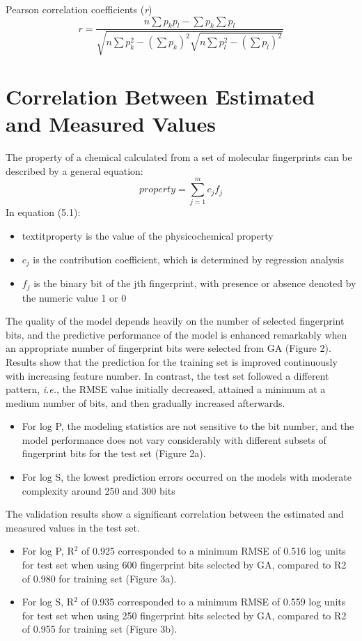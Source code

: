 \documentclass[10pt, letter]{report}
\renewcommand{\=}{\, =\, }
\newcommand{\+}{\, +\, }
\renewcommand{\-}{\, -\, }
\begin{document}
Pearson correlation coefficients (\textit{r})
\begin{equation}
r = \frac{n\sum{p_{k}p_{l}} - \sum{p_{k}}\sum{p_{l}}}{\sqrt{n\sum{p_{k}^{2}} - (\sum{p_{k}})^{2}\sqrt{n\sum{p_{l}^{2}} -(\sum{p_{l}})^{2}}}}
\end{equation}


\chapter{Correlation Between Estimated and Measured Values}



The property of a chemical calculated from a set of molecular fingerprints can be
described by a general equation:
\begin{equation}
property = \sum_{j = 1}^{m}c_{j}f_{j}
\end{equation}
In equation (5.1):
\begin{itemize}
\item textit{property} is the value of the physicochemical property
\item \(c_{j}\) is the contribution coefficient, which is determined by regression analysis
\item \(f_{j}\) is the binary bit of the jth fingerprint, with presence or absence denoted by
the numeric value 1 or 0
\end{itemize}
The quality of the model depends heavily on the number of selected fingerprint
bits, and the predictive performance of the model is enhanced remarkably when
an appropriate number of fingerprint bits were selected from GA (Figure 2).
Results show that the prediction for the training set is improved continuously with
increasing feature number. In contrast, the test set followed a different pattern,
\textit{i.e.}, the RMSE value initially decreased, attained a minimum at a medium number
of bits, and then gradually increased afterwards.
\begin{itemize}
\item For log P, the modeling statistics are not sensitive to the bit number, and the
model performance does not vary considerably with different subsets of
fingerprint bits for the test set (Figure 2a).
\item For log S, the lowest prediction errors occurred on the models with moderate
complexity around 250 and 300 bits
\end{itemize}

The validation results show a significant correlation between the estimated and
measured values in the test set.
\begin{itemize}
\item For log P, R\(^{2}\) of 0.925 corresponded to a minimum RMSE of 0.516 log units
for test set when using 600 fingerprint bits selected by GA, compared to R2 of
0.980 for training set (Figure 3a).
\item For log S, R\(^{2}\) of 0.935 corresponded to a minimum RMSE of 0.559 log units
for test set when using 250 fingerprint bits selected by GA, compared to R2 of
0.955 for training set (Figure 3b).
\end{itemize}
\end{document}
